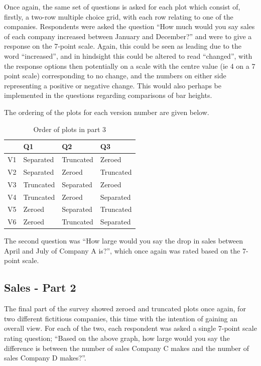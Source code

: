 \documentclass[
  11pt,
]{book}
\begin{document}
Once again, the same set of questions is asked for each plot which
consist of, firstly, a two-row multiple choice grid, with each row
relating to one of the companies. Respondents were asked the question
``How much would you say sales of each company increased between January
and December?'' and were to give a response on the 7-point scale. Again,
this could be seen as leading due to the word ``increased'', and in
hindsight this could be altered to read ``changed'', with the response
options then potentially on a scale with the centre value (ie 4 on a 7
point scale) corresponding to no change, and the numbers on either side
representing a positive or negative change. This would also perhaps be
implemented in the questions regarding comparisons of bar heights.

The ordering of the plots for each version number are given below.

\begin{center}
\begin{table}

\caption{\label{tab:unnamed-chunk-8}Order of plots in part 3}
\centering
\begin{tabular}[t]{l|l|l|l}
\hline
  & Q1 & Q2 & Q3\\
\hline
V1 & Separated & Truncated & Zeroed\\
\hline
V2 & Separated & Zeroed & Truncated\\
\hline
V3 & Truncated & Separated & Zeroed\\
\hline
V4 & Truncated & Zeroed & Separated\\
\hline
V5 & Zeroed & Separated & Truncated\\
\hline
V6 & Zeroed & Truncated & Separated\\
\hline
\end{tabular}
\end{table}
\end{center}

The second question was ``How large would you say the drop in sales
between April and July of Company A is?'', which once again was rated
based on the 7-point scale.

\subsection{Sales - Part 2}

The final part of the survey showed zeroed and truncated plots once
again, for two different fictitious companies, this time with the
intention of gaining an overall view. For each of the two, each
respondent was asked a single 7-point scale rating question; ``Based on
the above graph, how large would you say the difference is between the
number of sales Company C makes and the number of sales Company D
makes?''.
\end{document}
